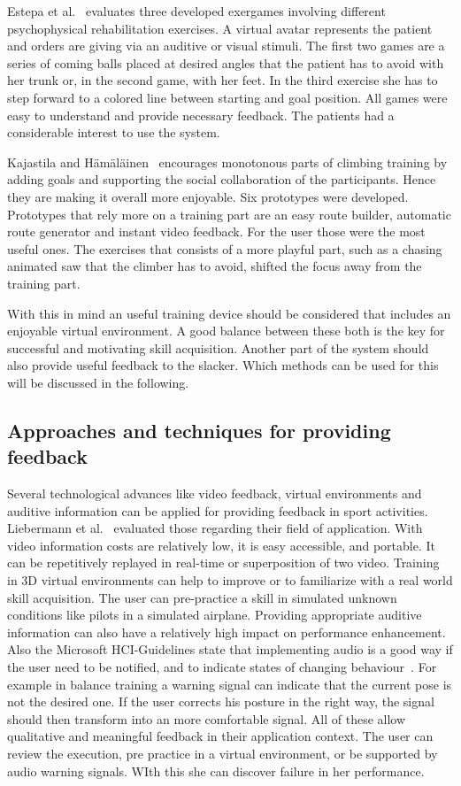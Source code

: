 Estepa et al.~\cite{Estepa2016-oj} evaluates three developed exergames involving different psychophysical rehabilitation exercises. A virtual avatar represents the patient and orders are giving via an auditive or visual stimuli. The first two games are a series of coming balls placed at desired angles that the patient has to avoid with her trunk or, in the second game, with her feet. In the third exercise she has to step forward to a colored line between starting and goal position. All games were easy to understand and provide necessary feedback. The patients had a considerable interest to use the system.

Kajastila and Hämäläinen~\cite{Kajastila2014-ug} encourages monotonous parts of climbing training by adding goals and supporting the social collaboration of the participants. Hence they are making it overall more enjoyable. Six prototypes were developed. Prototypes that rely more on a training part are an easy route builder, automatic route generator and instant video feedback. For the user those were the most useful ones. The exercises that consists of a more playful part, such as a chasing animated saw that the climber has to avoid, shifted the focus away from the training part. 

With this in mind an useful training device should be considered that includes an enjoyable virtual environment. A good balance between these both is the key for successful and motivating skill acquisition. Another part of the system should also provide useful feedback to the slacker. Which methods can be used for this will be discussed in the following.

\subsection{Approaches and techniques for providing feedback}

Several technological advances like video feedback, virtual environments and auditive information can be applied for providing feedback in sport activities. Liebermann et al.~\cite{Liebermann2002-zr} evaluated those regarding their field of application. With video information costs are relatively low, it is easy accessible, and portable. It can be repetitively replayed in real-time or superposition of two video. Training in 3D virtual environments can help to improve or to familiarize with a real world skill acquisition. The user can pre-practice a skill in simulated unknown conditions like pilots in a simulated airplane. Providing appropriate auditive information can also have a relatively high impact on performance enhancement. Also the Microsoft HCI-Guidelines state that implementing audio is a good way if the user need to be notified, and to indicate states of changing behaviour~\cite{MicrosoftHIG2014-mh}. For example in balance training a warning signal can indicate that the current pose is not the desired one. If the user corrects his posture in the right way, the signal should then transform into an more comfortable signal. All of these allow qualitative and meaningful feedback in their application context. The user can review the execution, pre practice in a virtual environment, or be supported by audio warning signals. WIth this she can discover failure in her performance.

